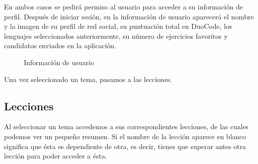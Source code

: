 En ambos casos se pedirá permiso al usuario para acceder a su información de perfil. Después de iniciar sesión, en la información de usuario aparecerá el nombre y la imagen de su perfil de red social, su puntuación total en DuoCode, los lenguajes seleccionados anteriormente, su número de ejercicios favoritos y candidatos enviados en la aplicación. 

\begin{figure}[H]
\begin{center}
\caption{Información de usuario\label{fig:usuario}}
\end{center}
\end{figure}

Una vez seleccionado un tema, pasamos a las lecciones.

\subsection{Lecciones}

Al seleccionar un tema accedemos a sus correspondientes lecciones, de las cuales podemos ver un pequeño resumen. Si el nombre de la lección aparece en blanco significa que ésta es dependiente de otra, es decir, tienes que superar antes otra lección para poder acceder a ésta.

